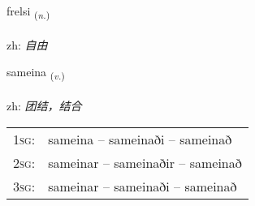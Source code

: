 \documentclass[frontgrid, backgrid]{flacards}\usepackage[]{graphicx}\usepackage[]{color}
\begin{document}
\renewcommand{\flhead}{\vskip5pt \fboxsep=0pt {\small\bfseries\footnotesize Nafnorð | 名词}}
\renewcommand{\fcfoot}{\vskip5pt \fboxsep=0pt \hspace{2pt}{\small\bfseries\footnotesize 2K}}

\renewcommand{\blhead}{\vskip5pt {\small\bfseries\footnotesize Nafnorð | 名词 }}
\renewcommand{\bcfoot}{\vskip5pt \hspace{2pt}{\small\bfseries\footnotesize 2K}}


{frelsi \small{\textsubscript{(\textit{n.})}} \\[1ex] %
\textphonetic{[frɛlsɪ]} \\
zh: \emph{自由} \\  [2ex]
\renewcommand*{\arraystretch}{0.8}
}

\renewcommand{\flhead}{\vskip5pt \fboxsep=0pt {\small\bfseries\footnotesize Sagnorð | 动词}}
\renewcommand{\fcfoot}{\vskip5pt \fboxsep=0pt \hspace{2pt}{\small\bfseries\footnotesize 2K}}

\renewcommand{\blhead}{\vskip5pt {\small\bfseries\footnotesize Sagnorð | 动词 }}
\renewcommand{\bcfoot}{\vskip5pt \hspace{2pt}{\small\bfseries\footnotesize 2K}}


{sameina \small{\textsubscript{(\textit{v.})}} \\[1ex] %
\textphonetic{[saːmeina]} \\
zh: \emph{团结，结合} \\  [2ex]
\renewcommand*{\arraystretch}{0.8}
\begin{tabular}{p{1cm}l}
\textsc{1sg}: & sameina -- sameinaði -- sameinað \\ 
\textsc{2sg}: & sameinar -- sameinaðir -- sameinað \\ 
\textsc{3sg}: & sameinar -- sameinaði -- sameinað \\ 
\end{tabular}
}
\end{document}
